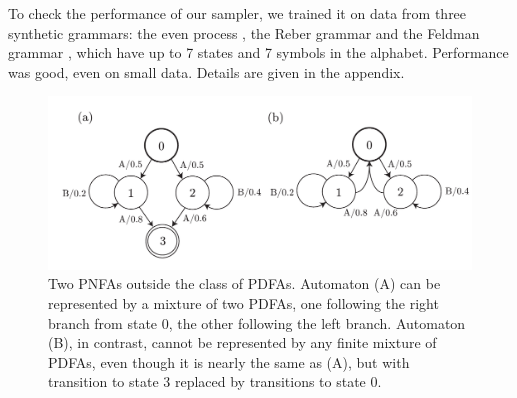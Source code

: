 To check the performance of our sampler, we trained it on data from three synthetic grammars: the even process \cite{Shalizi2004}, the Reber grammar \cite{Reber1967} and the Feldman grammar \cite{Feldman1966}, which have up to 7 states and 7 symbols in the alphabet.  Performance was good, even on small data.  Details are given in the appendix.

\begin{figure}
\begin{center}
\includegraphics[scale=0.6]{pnfa.pdf}
\caption{Two PNFAs outside the class of PDFAs.  Automaton (A) can be represented by a mixture of two PDFAs, one following the right branch from state 0, the other following the left branch.  Automaton (B), in contrast, cannot be represented by any finite mixture of PDFAs, even though it is nearly the same as (A), but with transition to state 3 replaced by transitions to state 0.}
\label{pnfa}
\end{center}
\end{figure}